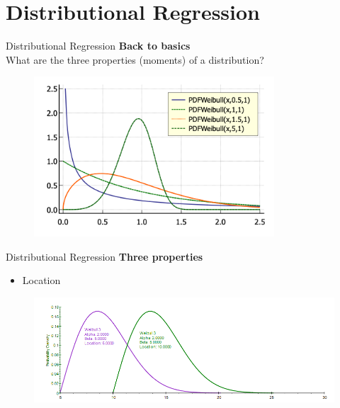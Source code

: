 \documentclass[t]{beamer} 	%
\begin{document}
\section{Distributional Regression}

\begin{frame}{Distributional Regression}
	\textbf{Back to basics} \\
	What are the three properties (moments) of a distribution?
	\begin{figure}
		\includegraphics[width = 0.8\textwidth]{images/weibull_all.png}
	\end{figure}
\end{frame}

\begin{frame}{Distributional Regression}
	\textbf{Three properties}
	\begin{itemize}
		\item Location
	\end{itemize}
	\begin{figure}
		\includegraphics[width=\textwidth]{images/weibull.png}
	\end{figure}
\end{frame}
\end{document}
